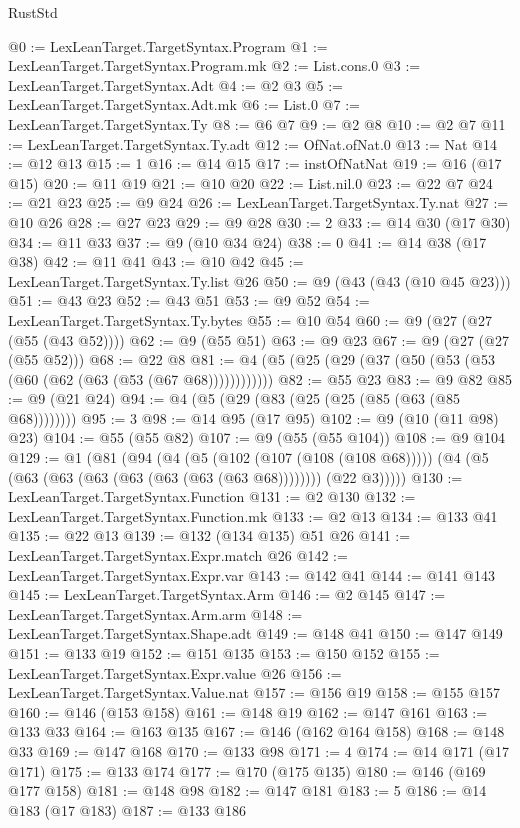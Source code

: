 \begin{lexlean}{RustStd}
\begin{coremodule}
@0 := LexLeanTarget.TargetSyntax.Program
@1 := LexLeanTarget.TargetSyntax.Program.mk
@2 := List.cons.{0}
@3 := LexLeanTarget.TargetSyntax.Adt
@4 := @2 @3
@5 := LexLeanTarget.TargetSyntax.Adt.mk
@6 := List.{0}
@7 := LexLeanTarget.TargetSyntax.Ty
@8 := @6 @7
@9 := @2 @8
@10 := @2 @7
@11 := LexLeanTarget.TargetSyntax.Ty.adt
@12 := OfNat.ofNat.{0}
@13 := Nat
@14 := @12 @13
@15 := 1
@16 := @14 @15
@17 := instOfNatNat
@19 := @16 (@17 @15)
@20 := @11 @19
@21 := @10 @20
@22 := List.nil.{0}
@23 := @22 @7
@24 := @21 @23
@25 := @9 @24
@26 := LexLeanTarget.TargetSyntax.Ty.nat
@27 := @10 @26
@28 := @27 @23
@29 := @9 @28
@30 := 2
@33 := @14 @30 (@17 @30)
@34 := @11 @33
@37 := @9 (@10 @34 @24)
@38 := 0
@41 := @14 @38 (@17 @38)
@42 := @11 @41
@43 := @10 @42
@45 := LexLeanTarget.TargetSyntax.Ty.list @26
@50 := @9 (@43 (@43 (@10 @45 @23)))
@51 := @43 @23
@52 := @43 @51
@53 := @9 @52
@54 := LexLeanTarget.TargetSyntax.Ty.bytes
@55 := @10 @54
@60 := @9 (@27 (@27 (@55 (@43 @52))))
@62 := @9 (@55 @51)
@63 := @9 @23
@67 := @9 (@27 (@27 (@55 @52)))
@68 := @22 @8
@81 := @4 (@5 (@25 (@29 (@37 (@50 (@53 (@53 (@60 (@62 (@63 (@53 (@67 @68))))))))))))
@82 := @55 @23
@83 := @9 @82
@85 := @9 (@21 @24)
@94 := @4 (@5 (@29 (@83 (@25 (@25 (@85 (@63 (@85 @68))))))))
@95 := 3
@98 := @14 @95 (@17 @95)
@102 := @9 (@10 (@11 @98) @23)
@104 := @55 (@55 @82)
@107 := @9 (@55 (@55 @104))
@108 := @9 @104
@129 := @1
    (@81
      (@94
        (@4
          (@5 (@102 (@107 (@108 (@108 @68)))))
          (@4 (@5 (@63 (@63 (@63 (@63 (@63 (@63 (@63 @68)))))))) (@22 @3)))))
@130 := LexLeanTarget.TargetSyntax.Function
@131 := @2 @130
@132 := LexLeanTarget.TargetSyntax.Function.mk
@133 := @2 @13
@134 := @133 @41
@135 := @22 @13
@139 := @132 (@134 @135) @51 @26
@141 := LexLeanTarget.TargetSyntax.Expr.match @26
@142 := LexLeanTarget.TargetSyntax.Expr.var
@143 := @142 @41
@144 := @141 @143
@145 := LexLeanTarget.TargetSyntax.Arm
@146 := @2 @145
@147 := LexLeanTarget.TargetSyntax.Arm.arm
@148 := LexLeanTarget.TargetSyntax.Shape.adt
@149 := @148 @41
@150 := @147 @149
@151 := @133 @19
@152 := @151 @135
@153 := @150 @152
@155 := LexLeanTarget.TargetSyntax.Expr.value @26
@156 := LexLeanTarget.TargetSyntax.Value.nat
@157 := @156 @19
@158 := @155 @157
@160 := @146 (@153 @158)
@161 := @148 @19
@162 := @147 @161
@163 := @133 @33
@164 := @163 @135
@167 := @146 (@162 @164 @158)
@168 := @148 @33
@169 := @147 @168
@170 := @133 @98
@171 := 4
@174 := @14 @171 (@17 @171)
@175 := @133 @174
@177 := @170 (@175 @135)
@180 := @146 (@169 @177 @158)
@181 := @148 @98
@182 := @147 @181
@183 := 5
@186 := @14 @183 (@17 @183)
@187 := @133 @186

\end{coremodule}
\end{lexlean}
